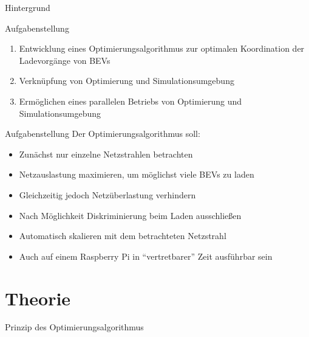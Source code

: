 \documentclass[aspectratio=169]{beamer}
\begin{document}
\begin{frame}{Hintergrund}
	\begin{figure}
		\centering
		
	\end{figure}
\end{frame}


\begin{frame}{Aufgabenstellung}
	\begin{enumerate}
		\item Entwicklung eines Optimierungsalgorithmus zur optimalen 
		Koordination der Ladevorgänge von BEVs
		\item Verknüpfung von Optimierung und Simulationsumgebung
		\item Ermöglichen eines parallelen Betriebs von Optimierung und
		Simulationsumgebung
	\end{enumerate}
\end{frame}


\begin{frame}{Aufgabenstellung}
	Der Optimierungsalgorithmus soll:
	\begin{itemize}
		\item Zunächst nur einzelne Netzstrahlen betrachten
		\item Netzauslastung maximieren, um möglichst viele BEVs zu laden
		\item Gleichzeitig jedoch Netzüberlastung verhindern
		\item Nach Möglichkeit Diskriminierung beim Laden ausschließen
		\item Automatisch skalieren mit dem betrachteten Netzstrahl
		\item Auch auf einem Raspberry Pi in \enquote{vertretbarer} Zeit 
		ausführbar sein
	\end{itemize}
	
\end{frame}

\section{Theorie}

\begin{frame}{Prinzip des Optimierungsalgorithmus}
	\begin{figure}
		\centering
		
	\end{figure}
\end{frame}
\end{document}
